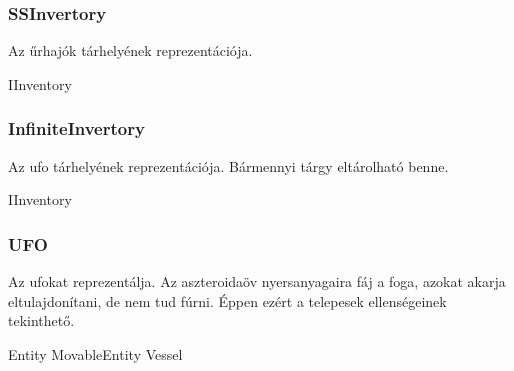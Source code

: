 \documentclass[../../projlab]{subfiles}
\begin{document}
\subsubsection{SSInvertory}
\begin{class-template-responsibility}
    Az űrhajók tárhelyének reprezentációja.
\end{class-template-responsibility}
\begin{class-template-interface}
    IInventory
\end{class-template-interface}
\begin{class-template-attribute}
\end{class-template-attribute}

\subsubsection{InfiniteInvertory}
\begin{class-template-responsibility}
    Az ufo tárhelyének reprezentációja. Bármennyi tárgy eltárolható benne.
\end{class-template-responsibility}
\begin{class-template-interface}
    IInventory
\end{class-template-interface}
\begin{class-template-attribute}
\end{class-template-attribute}

\subsubsection{UFO}
\begin{class-template-responsibility}
    Az ufokat reprezentálja.
    Az aszteroidaöv nyersanyagaira fáj a foga, azokat akarja eltulajdonítani, de nem tud fúrni. Éppen ezért a telepesek ellenségeinek tekinthető.
\end{class-template-responsibility}
\begin{class-template-baseclass}
    Entity \baseclass MovableEntity \baseclass Vessel
\end{class-template-baseclass}
\begin{class-template-attribute}
\end{class-template-attribute}
\end{document}
